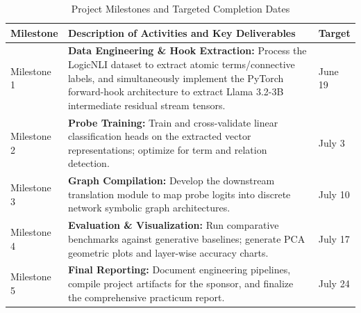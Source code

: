 \documentclass[12 pt]{article}  %
\begin{document}
\begin{table}[h!]
\centering
\caption{Project Milestones and Targeted Completion Dates}
\vspace{0.5cm}
\begin{tabular}{|l|p{7.5cm}|l|}
\hline
\textbf{Milestone} & \textbf{Description of Activities and Key Deliverables} & \textbf{Target} \\ \hline
Milestone 1 & \textbf{Data Engineering \& Hook Extraction:} Process the LogicNLI dataset to extract atomic terms/connective labels, and simultaneously implement the PyTorch forward-hook architecture to extract Llama 3.2-3B intermediate residual stream tensors. & June 19 \\ \hline
Milestone 2 & \textbf{Probe Training:} Train and cross-validate linear classification heads on the extracted vector representations; optimize for term and relation detection. & July 3 \\ \hline
Milestone 3 & \textbf{Graph Compilation:} Develop the downstream translation module to map probe logits into discrete network symbolic graph architectures. & July 10 \\ \hline
Milestone 4 & \textbf{Evaluation \& Visualization:} Run comparative benchmarks against generative baselines; generate PCA geometric plots and layer-wise accuracy charts. & July 17 \\ \hline
Milestone 5 & \textbf{Final Reporting:} Document engineering pipelines, compile project artifacts for the sponsor, and finalize the comprehensive practicum report. & July 24 \\ \hline
\end{tabular}
\end{table}

\cleardoublepage


\end{document}
